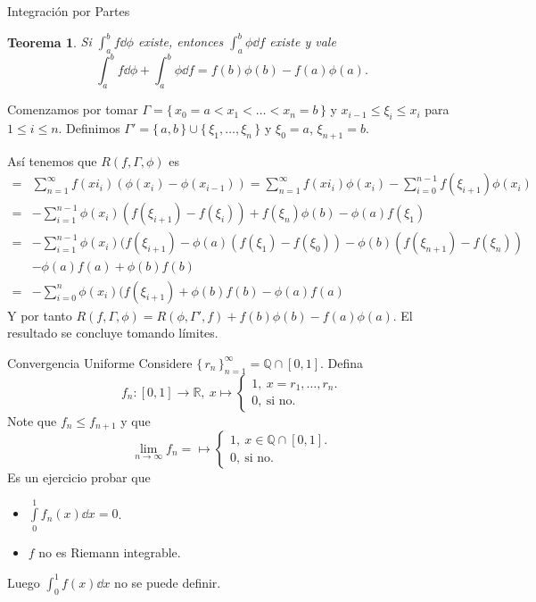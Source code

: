 \documentclass[utf8]{beamer}
\theoremstyle{plain}
\newtheorem{Th}{Teorema}               %
\theoremstyle{definition}
\theoremstyle{remark}
\numberwithin{equation}{section}
\newcommand{\Ga}{\Gamma}                %
\newcommand{\bQ}{\mathbb{Q}}    %
\newcommand{\bR}{\mathbb{R}}    %
\newcommand{\set}[1]{\{\,#1\,\}}    %
\renewcommand{\leq}{\leqslant}          %
\newcommand{\sucn}{_{n=1}^\infty} %
\renewcommand{\.}{\Cdot}                %
\begin{document}
\begin{frame}{Integración por Partes}
  \begin{Th}\label{thm:partes}
    Si $\int_a^bf\dd\phi$ existe, entonces $\int_a^b\phi\dd f $ existe y vale 
    $$\int_a^bf\dd\phi+\int_a^b\phi\dd f=f(b)\phi(b)-f(a)\phi(a).$$
  \end{Th}
  Comenzamos por tomar $\Ga=\set{x_0=a<x_1<\dots<x_n=b}$ y $x_{i-1}\leq \xi_i\leq x_i$ para $1\leq i\leq n$. Definimos $\Ga'=\set{a,b}\cup\set{\xi_1,\dots,\xi_n}$ y $\xi_0=a$, $\xi_{n+1}=b$.
\end{frame}

\begin{frame}
  Así tenemos que $R(f,\Ga,\phi)$ es
  \small{
  \begin{align*}
    =&\sum\sucn f(xi_i)(\phi(x_i)-\phi(x_{i-1}))=\sum\sucn f(xi_i)\phi(x_i)-\sum_{i=0}^{n-1}f(\xi_{i+1})\phi(x_{i})\\
    =&-\sum_{i=1}^{n-1}\phi(x_i)(f(\xi_{i+1})-f(\xi_i))+f(\xi_n)\phi(b)-\phi(a)f(\xi_1)\\
    =&-\sum_{i=1}^{n-1}\phi(x_i)(f(\xi_{i+1})-\phi(a)(f(\xi_1)-f(\xi_0))-\phi(b)(f(\xi_{n+1})-f(\xi_n))\\
    &-\phi(a)f(a)+\phi(b)f(b)\\
    =&-\sum_{i=0}^{n}\phi(x_i)(f(\xi_{i+1})+\phi(b)f(b)-\phi(a)f(a)
  \end{align*}}
  Y por tanto $R(f,\Ga,\phi)=R(\phi,\Ga',f)+f(b)\phi(b)-f(a)\phi(a)$. El resultado se concluye tomando límites.
\end{frame}

\begin{frame}{Convergencia Uniforme}\label{ej:integralNoDefn}
  Considere $\set{r_n}\sucn=\bQ\cap[0,1]$. Defina 
  $$f_n:[0,1]\to\bR,\ x\mapsto\begin{cases}
    1,\ x=r_1,\dots,r_n.\\
    0,\ \text{si no}.
  \end{cases}$$
  Note que $f_n\leq f_{n+1}$ y que 
  $$\lim_{n\to\infty}f_n=\mapsto\begin{cases}
    1,\ x\in\bQ\cap[0,1].\\
    0,\ \text{si no}.
  \end{cases}$$
  Es un \alert{ejercicio} probar que
  \begin{itemize}
    \item $\int\limits_0^1f_n(x)\dd x=0$.
    \item $f$ no es Riemann integrable.
  \end{itemize}
  Luego $\int_0^1f(x)\dd x$ no se puede  definir.
\end{frame}
\end{document}
